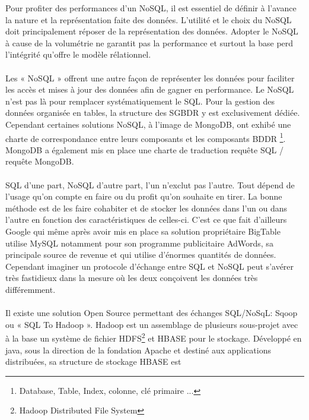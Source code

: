 Pour profiter des performances d'un \textsf{NoSQL}, il est essentiel
de définir à l'avance la nature et la représentation faite des données.
L'utilité et le choix du \textsf{NoSQL} doit principalement
réposer de la représentation des données. Adopter le \textsf{NoSQL} à
cause de la volumétrie ne garantit pas la performance et surtout la 
base perd l'intégrité qu'offre le modèle rélationnel.  
\\ 
\\ 
Les « \textsf{NoSQL} » offrent une autre façon
de représenter les données pour faciliter les accès et mises à jour des
données afin de gagner en performance. Le \textsf{NoSQL} n'est pas 
là pour remplacer systématiquement le  \textsf{SQL}. Pour la gestion des données 
organisée en tables, la structure des \textsf{SGBDR} y est exclusivement
dédiée. Cependant certaines solutions \textsf{NoSQL}, à l'image de \textsf{MongoDB}, ont
exhibé une charte de correspondance entre leurs composants et les composants \textsf{BDDR} 
\footnote{Database, Table, Index, colonne, clé
  primaire ...}. \textsf{MongoDB} a également mis
en place une charte de traduction requête \textsf{SQL} / requête
\textsf{MongoDB}.
\\
\\
\textsf{SQL} d'une part, \textsf{NoSQL} d'autre part, l'un n'exclut pas l'autre.
Tout dépend de l'usage qu'on compte en faire ou du profit qu'on
souhaite en tirer. La bonne méthode est de les faire cohabiter et de stocker
les données dans l'un ou dans l'autre en fonction des caractéristiques de 
celles-ci. C'est ce que fait d'ailleurs \textsf{Google} qui
même après avoir mis en place sa solution
propriétaire \textsf{BigTable} utilise \textsf{MySQL}
notamment pour son programme publicitaire \textsf{AdWords}, sa
principale source de revenue et qui utilise d'énormes quantités de
données. Cependant imaginer un protocole d'échange entre \textsf{SQL}
et \textsf{NoSQL} peut s'avérer très fastidieux dans la mesure où les
deux conçoivent les données très différemment.
\\
\\
Il existe une solution \textsf{Open Source} permettant des échanges
\textsf{SQL}/\textsf{NoSqL}: \textsf{Sqoop} ou « SQL To Hadoop
». \textsf{Hadoop} est un assemblage de plusieurs
sous-projet avec à la base un système de
fichier \textsf{HDFS}\footnote{Hadoop Distributed File System}
et \textsf{HBASE} pour le stockage. Développé en \textsf{java}, sous
la direction de la fondation \textsf{Apache} et destiné aux
applications distribuées, sa structure de stockage \textsf{HBASE} est
